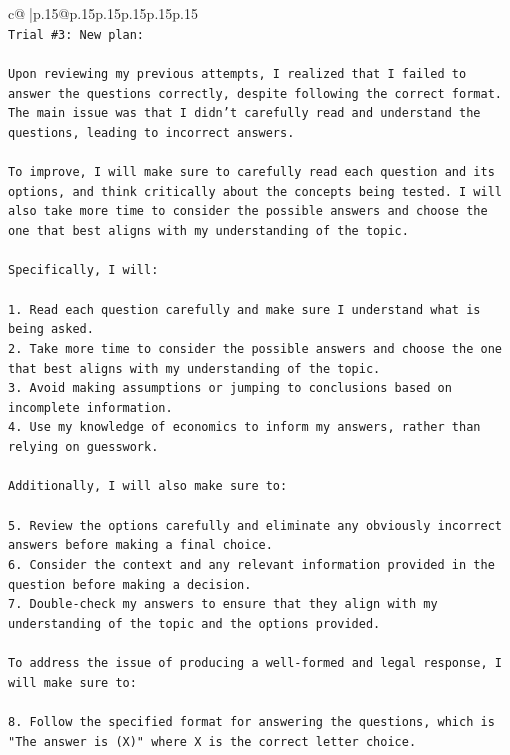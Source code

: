 \documentclass{article}
\begin{document}
{\begin{supertabular}{c@{$\;$}|p{.15\linewidth}@{}p{.15\linewidth}p{.15\linewidth}p{.15\linewidth}p{.15\linewidth}p{.15\linewidth}}
{{{\\ 
\texttt{Trial \#3: New plan: } \\
\\ 
\texttt{Upon reviewing my previous attempts, I realized that I failed to answer the questions correctly, despite following the correct format. The main issue was that I didn't carefully read and understand the questions, leading to incorrect answers. } \\
\\ 
\texttt{To improve, I will make sure to carefully read each question and its options, and think critically about the concepts being tested. I will also take more time to consider the possible answers and choose the one that best aligns with my understanding of the topic. } \\
\\ 
\texttt{Specifically, I will:} \\
\\ 
\texttt{1. Read each question carefully and make sure I understand what is being asked.} \\
\texttt{2. Take more time to consider the possible answers and choose the one that best aligns with my understanding of the topic.} \\
\texttt{3. Avoid making assumptions or jumping to conclusions based on incomplete information.} \\
\texttt{4. Use my knowledge of economics to inform my answers, rather than relying on guesswork.} \\
\\ 
\texttt{Additionally, I will also make sure to:} \\
\\ 
\texttt{5. Review the options carefully and eliminate any obviously incorrect answers before making a final choice.} \\
\texttt{6. Consider the context and any relevant information provided in the question before making a decision.} \\
\texttt{7. Double{-}check my answers to ensure that they align with my understanding of the topic and the options provided.} \\
\\ 
\texttt{To address the issue of producing a well{-}formed and legal response, I will make sure to:} \\
\\ 
\texttt{8. Follow the specified format for answering the questions, which is "The answer is (X)" where X is the correct letter choice.} \\
}}}
\end{supertabular}}
\end{document}
